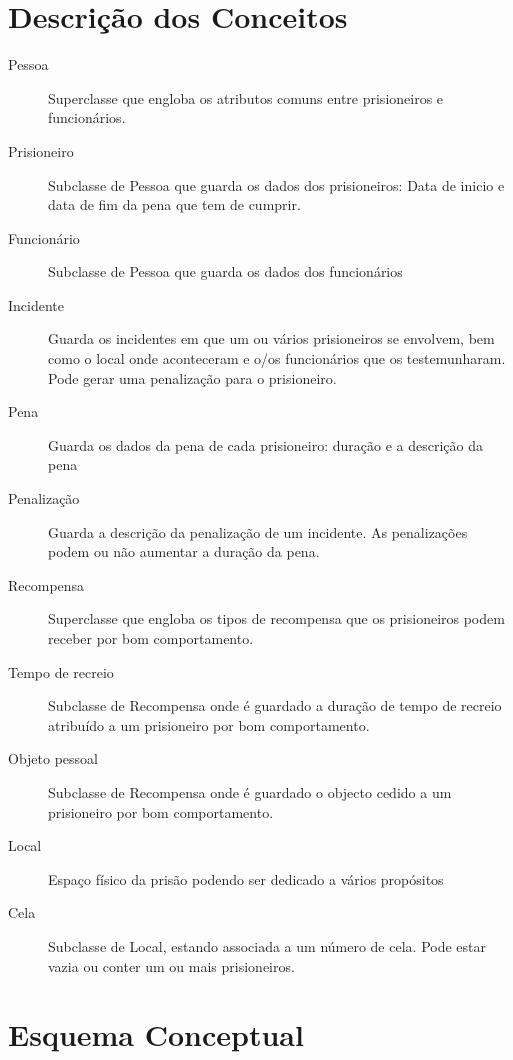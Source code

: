 \documentclass{article}
\begin{document}
\section{Descrição dos Conceitos}
\begin{description}
\item[Pessoa] Superclasse que engloba os atributos comuns entre prisioneiros e funcionários.
\item[Prisioneiro] Subclasse de Pessoa que guarda os dados dos prisioneiros: Data de inicio e
data de fim da pena que tem de cumprir.
\item[Funcionário] Subclasse de Pessoa que guarda os dados dos funcionários
\item[Incidente] Guarda os incidentes em que um ou vários prisioneiros se envolvem, bem como o local onde aconteceram e o/os funcionários que os testemunharam. Pode gerar uma penalização para o prisioneiro.
\item[Pena] Guarda os dados da pena de cada prisioneiro: duração e a descrição da pena
\item[Penalização] Guarda a descrição da penalização de um incidente. As penalizações podem ou
não aumentar a duração da pena.
\item[Recompensa] Superclasse que engloba os tipos de recompensa que os prisioneiros podem receber por bom comportamento.
\item[Tempo de recreio] Subclasse de Recompensa onde é guardado a duração de tempo de recreio atribuído a um prisioneiro por bom comportamento.
\item[Objeto pessoal] Subclasse de Recompensa onde é guardado o objecto cedido a um prisioneiro por bom comportamento.
\item[Local] Espaço físico da prisão podendo ser dedicado a vários propósitos
\item[Cela] Subclasse de Local, estando associada a um número de cela. Pode estar vazia ou conter um ou mais prisioneiros.
\end{description}
\newpage
\section{Esquema Conceptual}
\begin{center}
\end{center}
\newpage
\end{document}
